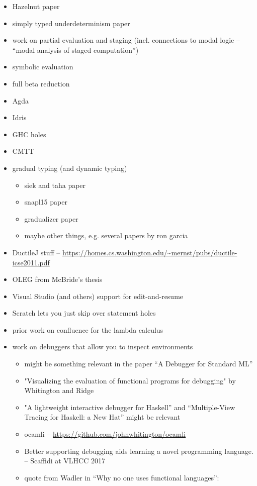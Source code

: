 \begin{itemize}
	\item Hazelnut paper
	\item simply typed underdeterminism paper
	\item work on partial evaluation and staging (incl. connections to modal logic -- ``modal analysis of staged computation'')
	\item symbolic evaluation
	\item full beta reduction
	\item Agda
	\item Idris
	\item GHC holes
	\item CMTT
	\item gradual typing (and dynamic typing)
		\begin{itemize}
			\item siek and taha paper
			\item snapl15 paper
			\item gradualizer paper
			\item maybe other things, e.g. several papers by ron garcia
		\end{itemize}
	\item DuctileJ stuff -- \url{https://homes.cs.washington.edu/~mernst/pubs/ductile-icse2011.pdf}
	\item OLEG from McBride's thesis
	\item Visual Studio (and others) support for edit-and-resume
	\item Scratch lets you just skip over statement holes
	\item prior work on confluence for the lambda calculus
	\item work on debuggers that allow you to inspect environments
		\begin{itemize}
		\item might be something relevant in the paper ``A Debugger for Standard ML'' 
		\item "Visualizing the evaluation of functional programs for debugging" by Whitington and Ridge
		\item "A lightweight interactive debugger for Haskell'' and ``Multiple-View Tracing for Haskell: a New Hat'' might be relevant
		\item ocamli -- \url{https://github.com/johnwhitington/ocamli}
		\item Better supporting debugging aids learning a novel programming language. -- Scaffidi at VLHCC 2017
		\item quote from Wadler in ``Why no one uses functional languages'':

\end{itemize}
\end{itemize}
